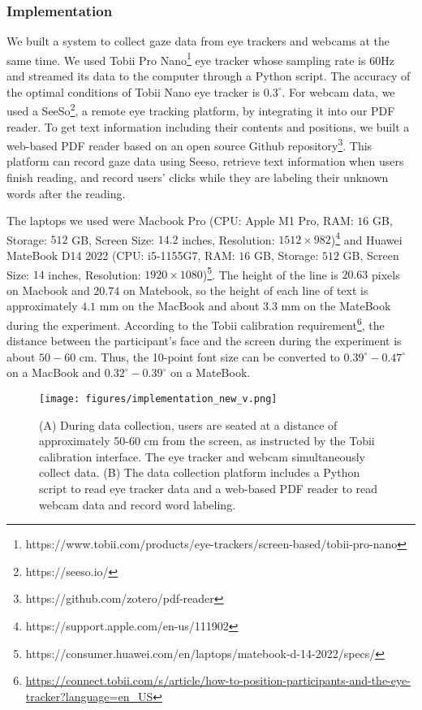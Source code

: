 \subsubsection{Implementation}
\label{sec:method_implementation}
We built a system to collect gaze data from eye trackers and webcams at the same time. We used Tobii Pro Nano\footnote{https://www.tobii.com/products/eye-trackers/screen-based/tobii-pro-nano} eye tracker whose sampling rate is 60Hz and streamed its data to the computer through a Python script. The accuracy of the optimal conditions of Tobii Nano eye tracker is $0.3^\circ$. For webcam data, we used a SeeSo\footnote{https://seeso.io/}, a remote eye tracking platform, by integrating it into our PDF reader. To get text information including their contents and positions, we built a web-based PDF reader based on an open source Github repository\footnote{https://github.com/zotero/pdf-reader}. This platform can record gaze data using Seeso, retrieve text information when users finish reading, and record users' clicks while they are labeling their unknown words after the reading. 

The laptops we used were Macbook Pro (CPU: Apple M1 Pro, RAM: $16$ GB, Storage: $512$ GB, Screen Size: $14.2$ inches, Resolution: $1512 \times 982$)\footnote{https://support.apple.com/en-us/111902} and Huawei MateBook D14 2022 (CPU: i5-1155G7, RAM: $16$ GB, Storage: $512$ GB, Screen Size: $14$ inches, Resolution: $1920 \times 1080$)\footnote{https://consumer.huawei.com/en/laptops/matebook-d-14-2022/specs/}. The height of the line is $20.63$ pixels on Macbook and $20.74$ on Matebook, so the height of each line of text is approximately $4.1$ mm on the MacBook and about $3.3$ mm on the MateBook during the experiment. According to the Tobii calibration requirement\footnote{\url{https://connect.tobii.com/s/article/how-to-position-participants-and-the-eye-tracker?language=en_US}}, the distance between the participant's face and the screen during the experiment is about $50-60$ cm. Thus, the 10-point font size can be converted to $0.39^\circ - 0.47^\circ$ on a MacBook and $0.32^\circ - 0.39^\circ$ on a MateBook.

\begin{figure}[htbp]
  \centering
  \texttt{[image: figures/implementation\_new\_v.png]}
  \caption{(A) During data collection, users are seated at a distance of approximately 50-60 cm from the screen, as instructed by the Tobii calibration interface. The eye tracker and webcam simultaneously collect data. (B) The data collection platform includes a Python script to read eye tracker data and a web-based PDF reader to read webcam data and record word labeling.}
  \label{fig:implementation} 
\end{figure}

